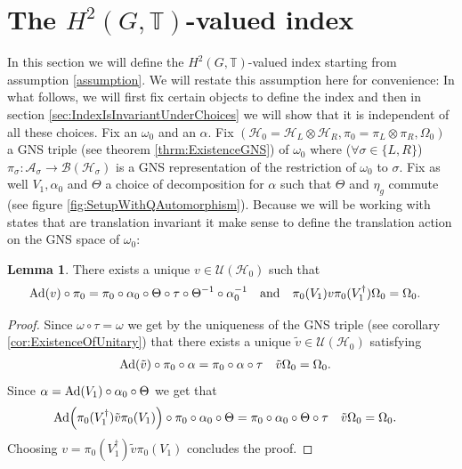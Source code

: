 \documentclass[12pt,a4paper,twoside]{article}
\let\originalleft\left
\let\originalright\right
\renewcommand{\left}{\mathopen{}\mathclose\bgroup\originalleft}
\renewcommand{\right}{\aftergroup\egroup\originalright}
\newcommand{\UU}{\mathcal U}
\newcommand{\BB}{\mathcal B}
\newcommand{\HH}{\mathcal H}
\newcommand{\TT}{\mathbb T}
\renewcommand{\AA}{\mathcal A}
\newcommand{\Ad}[1]{\textrm{Ad}\left(#1\right)}
\theoremstyle{definition}
\newtheorem{lemma}[theorem]{Lemma}
\numberwithin{equation}{section}
\begin{document}
\section{The $H^2(G,\TT)$-valued index}\label{sec:ProofFirstStatement}
In this section we will define the $H^2(G,\TT)$-valued index starting from assumption \ref{assumption}. We will restate this assumption here for convenience:
\assumptionOne*
In what follows, we will first fix certain objects to define the index and then in section \ref{sec:IndexIsInvariantUnderChoices} we will show that it is independent of all these choices. Fix an $\omega_0$ and an $\alpha$. Fix $(\HH_0=\HH_L\otimes\HH_R,\pi_0=\pi_L\otimes\pi_R,\Omega_0)$ a GNS triple (see theorem \ref{thrm:ExistenceGNS}) of $\omega_0$ where ($\forall\sigma\in\{L,R\}$) $\pi_\sigma:\AA_\sigma\rightarrow\BB(\HH_\sigma)$ is a GNS representation of the restriction of $\omega_0$ to $\sigma$. Fix as well $V_1,\alpha_0$ and $\Theta$ a choice of decomposition for $\alpha$ such that $\Theta$ and $\eta_g$ commute (see figure \ref{fig:SetupWithQAutomorphism}). Because we will be working with states that are translation invariant it make sense to define the translation action on the GNS space of $\omega_0$:
\begin{lemma}\label{lem:Definition_v}
	There exists a unique $v\in\UU(\HH_0)$ such that
	\begin{align}
		\Ad{v}\circ\pi_0&=\pi_0\circ\alpha_0\circ\Theta\circ\tau\circ\Theta^{-1}\circ\alpha_0^{-1}&&\text{and}&\pi_0(V_1)v\pi_0(V_1^\dagger)\Omega_0&=\Omega_0.
	\end{align}
\end{lemma}
\begin{proof}
	Since $\omega\circ\tau=\omega$ we get by the uniqueness of the GNS triple (see corollary \ref{cor:ExistenceOfUnitary}) that there exists a unique $\tilde{v}\in\UU(\HH_0)$ satisfying
	\begin{align}
		\Ad{\tilde{v}}\circ\pi_0\circ\alpha&=\pi_0\circ\alpha\circ\tau&\tilde{v}\Omega_0&=\Omega_0.
	\end{align}
	Since $\alpha=\Ad{V_1}\circ\alpha_0\circ\Theta$ we get that
	\begin{align}
		\Ad{\pi_0(V_1^\dagger)\tilde{v}\pi_0(V_1)}\circ\pi_0\circ\alpha_0\circ\Theta&=\pi_0\circ\alpha_0\circ\Theta\circ\tau&\tilde{v}\Omega_0&=\Omega_0.
	\end{align}
	Choosing $v=\pi_0(V_1^\dagger)\tilde{v}\pi_0(V_1)$  concludes the proof.
\end{proof}
\end{document}
